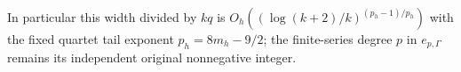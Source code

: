 In particular this width divided by $kq$ is
$O_h((\log(k+2)/k)^{(p_h-1)/p_h})$ with the fixed quartet
tail exponent $p_h=8m_h-9/2$; the finite-series degree
$p$ in $e_{p,\Gamma}$ remains its independent original
nonnegative integer.